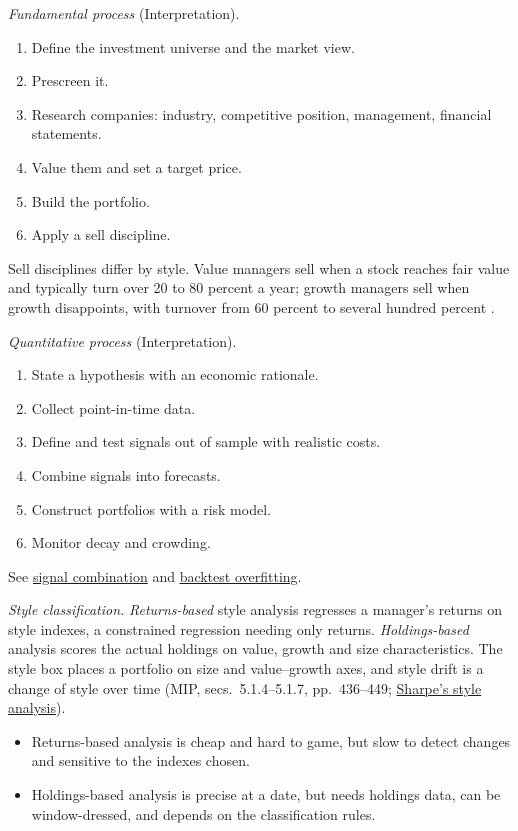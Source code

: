 \begin{qfmethod}\label{meth:active-equity-strategy-creation}
 \emph{Fundamental process} (Interpretation).
\begin{enumerate}
\item Define the investment universe and the market view.
\item Prescreen it.
\item Research companies: industry, competitive position, management, financial statements.
\item Value them and set a target price.
\item Build the portfolio.
\item Apply a sell discipline.
\end{enumerate}
Sell disciplines differ by style. Value managers sell when a stock reaches fair value and typically turn over 20 to 80 percent a year; growth managers sell when growth disappoints, with turnover from 60 percent to several hundred percent \citep[chap.~7, sec.~5.4, pp.~454--455]{managing-investment-portfolios-2007}.

\emph{Quantitative process} (Interpretation).
\begin{enumerate}
\item State a hypothesis with an economic rationale.
\item Collect point-in-time data.
\item Define and test signals out of sample with realistic costs.
\item Combine signals into forecasts.
\item Construct portfolios with a risk model.
\item Monitor decay and crowding.
\end{enumerate}
See \hyperref[meth:alpha-signal-combination]{signal combination} and \hyperref[meth:deflated-sharpe-ratio]{backtest overfitting}.

\emph{Style classification.} \emph{Returns-based} style analysis regresses a manager's returns on style indexes, a constrained regression needing only returns. \emph{Holdings-based} analysis scores the actual holdings on value, growth and size characteristics. The style box places a portfolio on size and value--growth axes, and style drift is a change of style over time (MIP, secs.~5.1.4--5.1.7, pp.~436--449; \hyperref[meth:manager-due-diligence]{Sharpe's style analysis}).
\begin{itemize}
\item Returns-based analysis is cheap and hard to game, but slow to detect changes and sensitive to the indexes chosen.
\item Holdings-based analysis is precise at a date, but needs holdings data, can be window-dressed, and depends on the classification rules.
\end{itemize}


\end{qfmethod}
